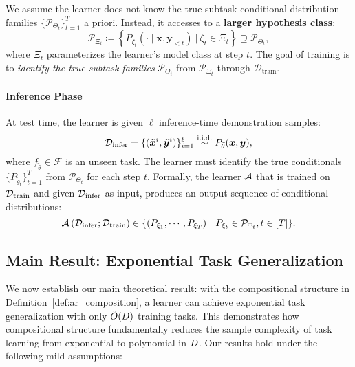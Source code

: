 We assume the learner does not know the true subtask conditional distribution families $\{\mathcal{P}_{\Theta_t}\}_{t=1}^T$ a priori. Instead, it accesses to a \textbf{larger hypothesis class}:
\[
\mathcal{P}_{\Xi_t} \coloneqq \left\{ P_{\zeta_t}(\cdot \mid \bm{x}, \bm y_{<t}) \ \big| \ \zeta_t \in \Xi_t \right\} \supseteq \mathcal{P}_{\Theta_t},
\]
where $\Xi_t$ parameterizes the learner’s model class at step $t$. The goal of training is to \textit{identify the true subtask families} $\mathcal{P}_{\Theta_t}$ from $\mathcal{P}_{\Xi_t}$ through $\mathcal{D}_{\mathrm{train}}$.

\vspace{-2mm}
\paragraph{Inference Phase}
At test time, the learner is given $\ell$ inference-time demonstration samples:
\[
\mathcal{D}_{\mathrm{infer}} = \{(\tilde {\bm{x}}^i, \tilde{\bm{y}}^i)\}_{i=1}^\ell \overset{\text{i.i.d.}}{\sim} P_{\tilde{\theta}}({\bm{x}}, {\bm{y}}),
\]
where $f_{\tilde{\theta}} \in \mathcal{F}$ is an unseen task. The learner must identify the true conditionals $\{P_{\tilde{\theta}_t}\}_{t=1}^T$ from $\mathcal{P}_{\Theta_t}$ for each step $t$. Formally, the learner ${\mathcal{A}}$ that is trained on ${\mathcal{D}}_{\mathrm{train}}$ and given ${\mathcal{D}}_{\mathrm{infer}}$ as input, produces an output sequence of conditional distributions:
\[
\mathcal{A}\left(\mathcal{D}_{\mathrm{infer}}; \mathcal{D}_{\mathrm{train}}\right) \in \{(P_{\xi_1},\cdots,P_{\xi_T})~|~P_{\xi_t}\in {\mathcal{P}}_{\Xi_t}, t\in [T]\}.
\]




\subsection{Main Result: Exponential Task Generalization}\label{sec: Exp Task Generalization}


We now establish our main theoretical result: with the compositional structure in Definition~\ref{def:ar_composition}, a learner can achieve exponential task generalization with only $\tilde{O}(D)$ training tasks. This demonstrates how compositional structure fundamentally reduces the sample complexity of task learning from exponential to polynomial in $D$. Our results hold under the following  mild assumptions:




